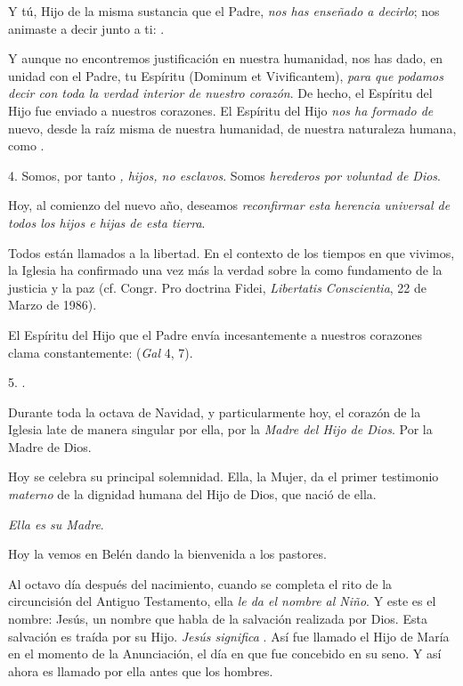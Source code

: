 \begin{body}
	Y tú, Hijo de la misma sustancia que el Padre, \emph{nos has enseñado a 	decirlo}; nos animaste a decir junto a ti: .

	Y aunque no encontremos justificación en nuestra humanidad, nos has dado, en unidad con el Padre, tu Espíritu  (Dominum et Vivificantem), \emph{para que podamos decir  	con toda la verdad interior de nuestro corazón}. De hecho, el Espíritu del Hijo fue enviado a nuestros corazones. El Espíritu del Hijo \emph{nos ha formado de} nuevo, desde la raíz misma de nuestra humanidad, de nuestra naturaleza humana, como .

	4. Somos, por tanto \emph{, hijos, no esclavos}. Somos \emph{herederos 	por voluntad de Dios}.

	Hoy, al comienzo del nuevo año, deseamos \emph{reconfirmar esta herencia 	universal de todos los hijos e hijas de esta tierra}.

	Todos están llamados a la libertad. En el contexto de los tiempos en que vivimos, la Iglesia ha confirmado una vez más la verdad sobre la  como fundamento de la justicia y la paz (cf. Congr. Pro doctrina Fidei, \emph{Libertatis Conscientia}, 22 de Marzo de 1986).

	El Espíritu del Hijo que el Padre envía incesantemente a nuestros corazones clama constantemente:  (\emph{Gal} 4, 7).

	5. .

	Durante toda la octava de Navidad, y particularmente hoy, el corazón de la Iglesia late de manera singular por ella, por la \emph{Madre del Hijo 	de Dios}. Por la Madre de Dios.

	Hoy se celebra su principal solemnidad. Ella, la Mujer, da el primer testimonio \emph{materno} de la dignidad humana del Hijo de Dios, que nació de ella.

	\emph{Ella es su Madre}.

	Hoy la vemos en Belén dando la bienvenida a los pastores.

	Al octavo día después del nacimiento, cuando se completa el rito de la circuncisión del Antiguo Testamento, ella \emph{le da el nombre al 	Niño}. Y este es el nombre: Jesús, un nombre que habla de la salvación realizada por Dios. Esta salvación es traída por su Hijo. \emph{Jesús 	significa }. Así fue llamado el Hijo de María en el momento de la Anunciación, el día en que fue concebido en su seno. Y así ahora es llamado por ella antes que los hombres.


\end{body}

